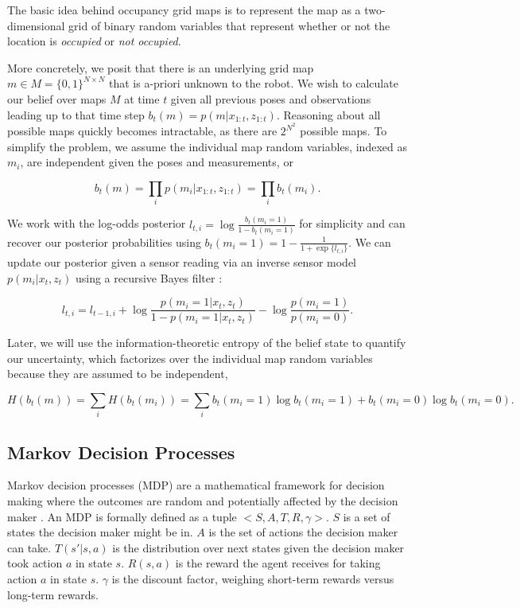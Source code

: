 \documentclass{article}
\begin{document}
The basic idea behind occupancy grid maps is to represent the map as a two-dimensional grid of binary random variables that represent whether or not the location is \emph{occupied} or \emph{not occupied}.

More concretely, we posit that there is an underlying grid map $m \in M = \{0, 1\}^{N \times N}$ that is a-priori unknown to the robot. We wish to calculate our belief over maps $M$ at time $t$ given all previous poses and observations leading up to that time step $b_t(m) = p(m|x_{1:t}, z_{1:t})$. Reasoning about all possible maps quickly becomes intractable, as there are $2^{N^2}$ possible maps. To simplify the problem, we assume the individual map random variables, indexed as $m_i$, are independent given the poses and measurements, or

$$b_t(m)= \prod_{i} p(m_i|x_{1:t}, z_{1:t}) = \prod_{i} b_t(m_i).$$

We work with the log-odds posterior $l_{t, i} = \log \frac{b_t(m_i=1)}{1 - b_t(m_i=1)}$ for simplicity and can recover our posterior probabilities using $b_t(m_i=1) = 1 - \frac{1}{1 + \exp\{l_{t, i}\}}$. We can update our posterior given a sensor reading via an inverse sensor model $p(m_i | x_t, z_t)$ using a recursive Bayes filter \cite{thrun2005probabilistic}:

\begin{equation}l_{t, i} = l_{t-1, i} + \log \frac{p(m_i=1 | x_t, z_t)}{1-p(m_i=1 | x_t, z_t)} - \log \frac{p(m_i = 1)}{p(m_i = 0)}.
\label{recbayesfilter}
\end{equation}

Later, we will use the information-theoretic entropy of the belief state to quantify our uncertainty, which factorizes over the individual map random variables because they are assumed to be independent,

$$H(b_t(m)) = \sum_i H(b_t(m_i)) = \sum_i b_t(m_i = 1) \log b_t(m_i = 1) + b_t(m_i = 0) \log b_t(m_i = 0).$$

\subsection{Markov Decision Processes}
\label{sec:mdp}

Markov decision processes (MDP) are a mathematical framework for decision making where the outcomes are random and potentially affected by the decision maker \cite{sutton1998reinforcement}. An MDP is formally defined as a tuple $<S, A, T, R, \gamma>$. $S$ is a set of states the decision maker might be in. $A$ is the set of actions the decision maker can take. $T(s'|s, a)$ is the distribution over next states given the decision maker took action $a$ in state $s$. $R(s, a)$ is the reward the agent receives for taking action $a$ in state $s$. $\gamma$ is the discount factor, weighing short-term rewards versus long-term rewards.
\end{document}
